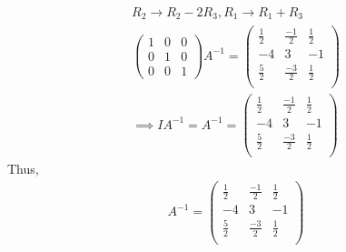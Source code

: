 \documentclass{article}
\begin{document}
\begin{gather*}
R_2 \rightarrow R_2 - 2R_3, R_1 \rightarrow R_1 + R_3\\
\begin{pmatrix}
1 & 0 & 0\\
0 & 1 & 0\\
0 & 0 & 1
\end{pmatrix} A^{-1} = \begin{pmatrix}
\frac{1}{2} & \frac{-1}{2} & \frac{1}{2}\\
-4 & 3 & -1\\
\frac{5}{2} & \frac{-3}{2} & \frac{1}{2}\\
\end{pmatrix}\\
\implies IA^{-1} = A^{-1} =  \begin{pmatrix}
\frac{1}{2} & \frac{-1}{2} & \frac{1}{2}\\
-4 & 3 & -1\\
\frac{5}{2} & \frac{-3}{2} & \frac{1}{2}\\
\end{pmatrix}
\end{gather*}
Thus,
\begin{gather*}
     A^{-1} =  \begin{pmatrix}
\frac{1}{2} & \frac{-1}{2} & \frac{1}{2}\\
-4 & 3 & -1\\
\frac{5}{2} & \frac{-3}{2} & \frac{1}{2}\\
\end{pmatrix}
\end{gather*}
\end{document}
